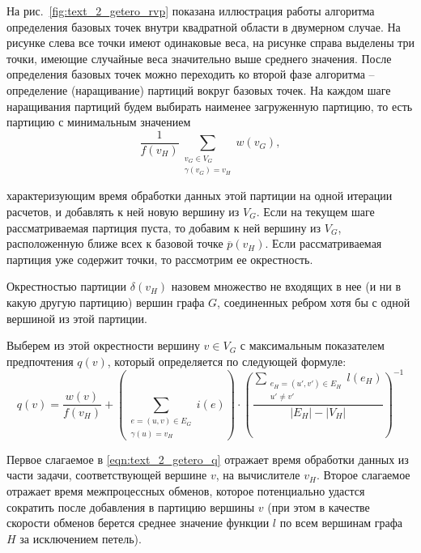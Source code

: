 На рис.~\ref{fig:text_2_getero_rvp} показана иллюстрация работы алгоритма определения базовых точек внутри квадратной области в двумерном случае.
На рисунке слева все точки имеют одинаковые веса, на рисунке справа выделены три точки, имеющие случайные веса значительно выше среднего значения.
После определения базовых точек можно переходить ко второй фазе алгоритма -- определение (наращивание) партиций вокруг базовых точек.
На каждом шаге наращивания партиций будем выбирать наименее загруженную партицию, то есть партицию с минимальным значением
\begin{equation}
	\frac{1}{f(v_H)} \sum_{\substack{v_G \in V_G \\ \gamma(v_G) = v_H}}{w(v_G)},
\end{equation}

характеризующим время обработки данных этой партиции на одной итерации расчетов, и добавлять к ней новую вершину из $V_G$.
Если на текущем шаге рассматриваемая партиция пуста, то добавим к ней вершину из $V_G$, расположенную ближе всех к базовой точке $\overline{p}(v_H)$.
Если рассматриваемая партиция уже содержит точки, то рассмотрим ее окрестность.

\begin{definition}
Окрестностью партиции $\delta(v_H)$ назовем множество не входящих в нее (и ни в какую другую партицию) вершин графа $G$, соединенных ребром хотя бы с одной вершиной из этой партиции.
\end{definition}

Выберем из этой окрестности вершину $v \in V_G$ с максимальным показателем предпочтения $q(v)$, который определяется по следующей формуле:
\begin{equation}\label{eqn:text_2_getero_q}
	q(v) = \frac{w(v)}{f(v_H)} +
		\left( \sum_{\substack{e = (u, v) \in E_G \\ \gamma(u) = v_H}}{i(e)} \right) \cdot
		\left( \frac{\sum_{\substack{e_H = (u', v') \in E_H \\ u' \ne v'}}{l(e_H)}}{|E_H| - |V_H|} \right)^{-1}
\end{equation}

Первое слагаемое в \eqref{eqn:text_2_getero_q} отражает время обработки данных из части задачи, соответствующей вершине $v$, на вычислителе $v_H$.
Второе слагаемое отражает время межпроцессных обменов, которое потенциально удастся сократить после добавления в партицию вершины $v$ (при этом в качестве скорости обменов берется среднее значение функции $l$ по всем вершинам графа $H$ за исключением петель).

